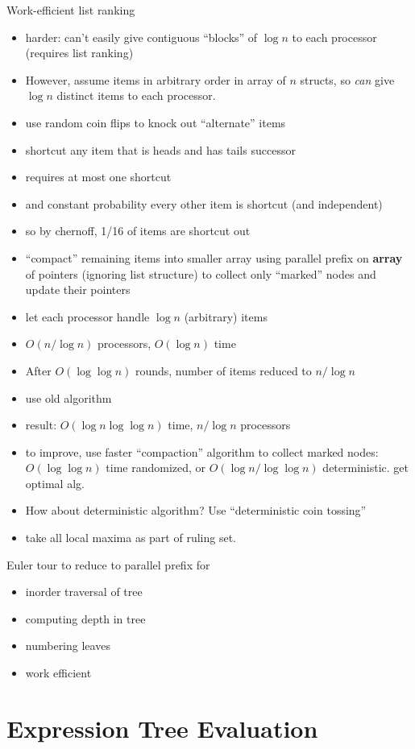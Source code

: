 \documentclass[12pt]{article}
\begin{document}
Work-efficient list ranking
\begin{itemize}
\item harder: can't easily give contiguous ``blocks'' of $\log n$ to each
  processor (requires list ranking)
\item However, assume items in arbitrary order in array of $ n$
  structs, so \emph{can} give $\log n$ distinct items to each processor.
\item use random coin flips to knock out ``alternate'' items
\item shortcut any item that is heads and has tails successor
\item requires at most one shortcut
\item and constant probability every other item is shortcut (and
  independent)
\item so by chernoff, 1/16 of items are shortcut out
\item ``compact'' remaining items into smaller array using parallel
  prefix on \textbf{array} of pointers (ignoring list structure) to
  collect only ``marked'' nodes and update their pointers 
\item let each processor handle $\log n$ (arbitrary) items
\item $O(n/\log n)$ processors, $O(\log n)$ time
\item After $O(\log\log n)$ rounds, number of items reduced to $n/\log
  n$
\item use old algorithm
\item result: $O(\log n \log\log n)$ time, $n/\log n$ processors
\item to improve, use faster ``compaction'' algorithm to collect
  marked nodes: $O(\log\log n)$ time randomized, or $O(\log n/\log\log
  n)$ deterministic.  get optimal alg.
\item How about deterministic algorithm?  Use ``deterministic coin
  tossing''
\item take all local maxima as part of ruling set.
\end{itemize}

Euler tour to reduce to parallel prefix for
\begin{itemize}
\item inorder traversal of tree
\item computing depth in tree
\item numbering leaves
\item work efficient
\end{itemize}

\section*{Expression Tree Evaluation}
\end{document}

